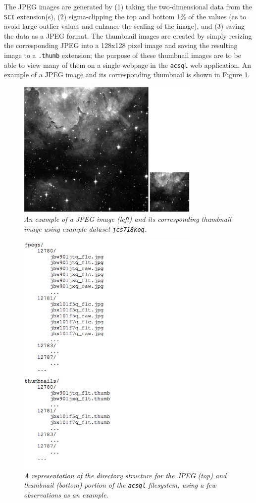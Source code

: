 \documentclass[10pt,journal,compsoc]{IEEEtran}
\begin{document}
The JPEG images are generated by (1) taking the two-dimensional data from the \texttt{SCI} extension(s), (2) sigma-clipping the top and bottom 1\% of the values (as to avoid large
outlier values and enhance the scaling of the image), and (3) saving the data as a JPEG format.  The thumbnail images are created by simply resizing the corresponding
JPEG into a 128x128 pixel image and saving the resulting image to a \texttt{.thumb} extension; the purpose of these thumbnail images are to be able to view many of them on a
single webpage in the \texttt{acsql} web application.  An example of a JPEG image and its corresponding thumbnail is shown in Figure \ref{fig9}.

\begin{figure}[!h]
\centering
\includegraphics[width=3.5in]{./figures/jpeg_and_thumbnail.png}
\caption{\textit{An example of a JPEG image (left) and its corresponding thumbnail image using example dataset \texttt{jcs718koq}.}}
\label{fig9}
\end{figure}

\begin{figure}[!h]
\centering
\includegraphics[width=3.5in]{./figures/jpeg_filesystem_listings.png}
\caption{\textit{A representation of the directory structure for the JPEG (top) and thumbnail (bottom) portion of the \texttt{acsql} filesystem, using a few observations
as an example.}}
\label{fig10}
\end{figure}
\end{document}
